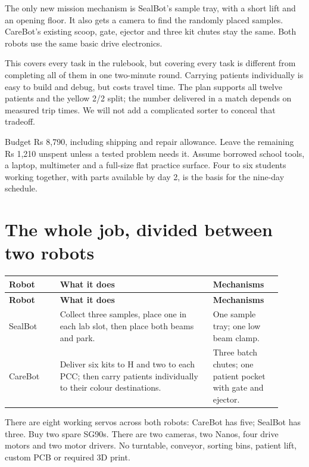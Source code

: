 \documentclass[10pt,a4paper]{article}
\begin{document}
The only new mission mechanism is SealBot's sample tray, with a short lift and an opening floor. It also gets a camera to find the randomly placed samples. CareBot's existing scoop, gate, ejector and three kit chutes stay the same. Both robots use the same basic drive electronics.

This covers every task in the rulebook, but covering every task is different from completing all of them in one two-minute round. Carrying patients individually is easy to build and debug, but costs travel time. The plan supports all twelve patients and the yellow 2/2 split; the number delivered in a match depends on measured trip times. We will not add a complicated sorter to conceal that tradeoff.

Budget Rs 8,790, including shipping and repair allowance. Leave the remaining Rs 1,210 unspent unless a tested problem needs it. Assume borrowed school tools, a laptop, multimeter and a full-size flat practice surface. Four to six students working together, with parts available by day 2, is the basis for the nine-day schedule.

\section{The whole job, divided between two robots}
\small\begin{longtable}{@{}>{\raggedright\arraybackslash}p{0.17\linewidth}>{\raggedright\arraybackslash}p{0.51\linewidth}>{\raggedright\arraybackslash}p{0.23\linewidth}@{}}
\toprule
\textbf{Robot} & \textbf{What it does} & \textbf{Mechanisms} \\
\midrule\endfirsthead
\toprule\textbf{Robot} & \textbf{What it does} & \textbf{Mechanisms} \\\midrule\endhead
SealBot & Collect three samples, place one in each lab slot, then place both beams and park. & One sample tray; one low beam clamp. \\[3pt]
CareBot & Deliver six kits to H and two to each PCC; then carry patients individually to their colour destinations. & Three batch chutes; one patient pocket with gate and ejector. \\[3pt]
\bottomrule\end{longtable}\normalsize
There are eight working servos across both robots: CareBot has five; SealBot has three. Buy two spare SG90s. There are two cameras, two Nanos, four drive motors and two motor drivers. No turntable, conveyor, sorting bins, patient lift, custom PCB or required 3D print.
\end{document}
